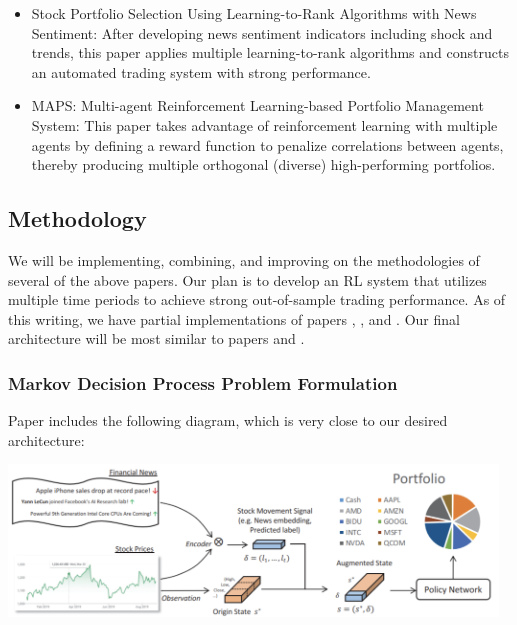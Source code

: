 \begin{itemize}
\item \cite{learn_to_rank} Stock Portfolio Selection Using Learning-to-Rank Algorithms with News Sentiment: 
After developing news sentiment indicators including shock and trends, this paper applies 
multiple learning-to-rank algorithms and constructs an automated trading system with strong performance.

\item \cite{maps} MAPS: Multi-agent Reinforcement Learning-based Portfolio Management System: 
This paper takes advantage of reinforcement learning with multiple agents by defining a 
reward function to penalize correlations between agents, thereby producing multiple orthogonal 
(diverse) high-performing portfolios.

\end{itemize}

\subsection{Methodology}

We will be implementing, combining, and improving on the methodologies of several of the above papers. 
Our plan is to develop an RL system that utilizes multiple time periods to achieve strong out-of-sample 
trading performance. As of this writing, we have partial implementations of papers \cite{drl_mvo}, \cite{drl_modern_portfolio_theory}, and \cite{drl_framework}.
 Our final architecture will be most similar to papers \cite{rl_augmented_states} and \cite{drl_framework}.

\subsubsection{Markov Decision Process Problem Formulation}

Paper \cite{rl_augmented_states} includes the following diagram, which is very close to our desired 
architecture:

\begin{center}
\includegraphics[width=13cm]{formulation.png}
\end{center}

